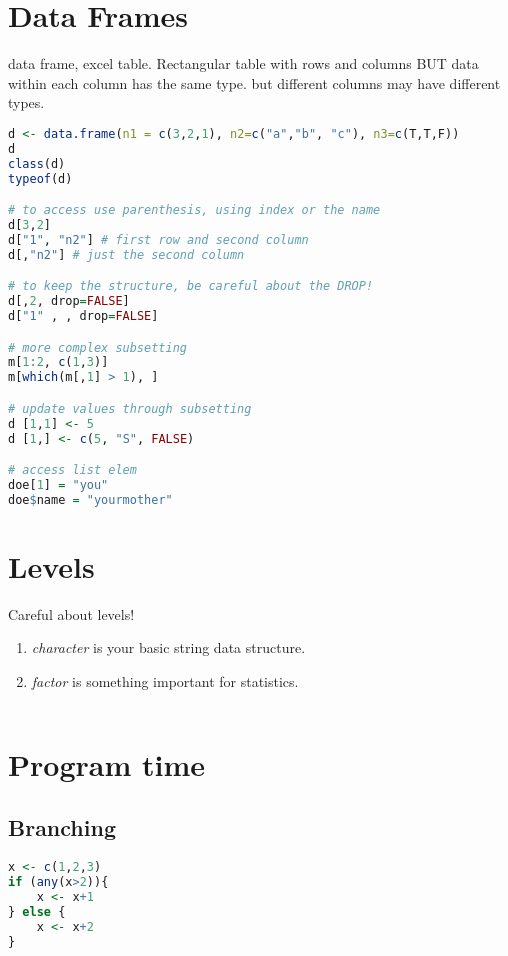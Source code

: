 \documentclass[11pt]{article}
\begin{document}
\section{Data Frames} %
\label{sec:data_frames}
data frame, excel table.
Rectangular table with rows and columns BUT data within each column has the same type. but different columns may have different types.
\begin{lstlisting}[language=R]
d <- data.frame(n1 = c(3,2,1), n2=c("a","b", "c"), n3=c(T,T,F))
d
class(d)
typeof(d)

# to access use parenthesis, using index or the name
d[3,2]
d["1", "n2"] # first row and second column
d[,"n2"] # just the second column

# to keep the structure, be careful about the DROP!
d[,2, drop=FALSE]
d["1" , , drop=FALSE]

# more complex subsetting
m[1:2, c(1,3)]
m[which(m[,1] > 1), ]

# update values through subsetting
d [1,1] <- 5
d [1,] <- c(5, "S", FALSE)

# access list elem
doe[1] = "you"
doe$name = "yourmother"
\end{lstlisting}

\section{Levels} %
\label{sec:levels}
Careful about levels!	 
\begin{enumerate}
	\item \textit{character} is your basic string data structure.
	\item \textit{factor} is something important for statistics.
\end{enumerate}

\begin{lstlisting}[language=R]


\end{lstlisting}


\section{Program time} %
\label{sec:program_time}
\subsection{Branching} %
\label{sub:branching}
\begin{lstlisting}[language=R]
x <- c(1,2,3)
if (any(x>2)){
	x <- x+1
} else {
	x <- x+2
}
\end{lstlisting}
\end{document}
